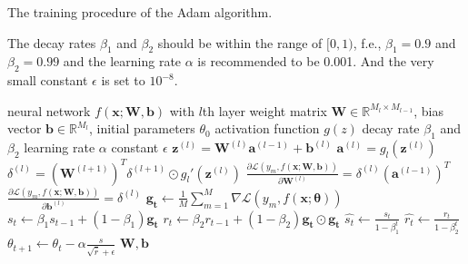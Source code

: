 \documentclass[
	parskip, 			   %
	twoside, 			   %
	DIV=14, 			   %
	BCOR=15.0mm, 		   %
	headsepline, 		   %
	open=right, 		   %
	captions=tableheading, %
	bibliography=totoc,    %
	numbers=noenddot       %
]{scrreprt}
\begin{document}
\clearpage
\begin{algorithm}[h!]
\caption{The training procedure of the Adam algorithm.}
The decay rates $\beta_1$ and $\beta_2$ should be within the range of $[0,1)$, f.e., $\beta_1=0.9$ and $\beta_2=0.99$ and the learning rate $\alpha$ is recommended to be 0.001. And the very small constant $\epsilon$ is set to $10^{-8}$.
\label{alg:Adam_alg}
    \begin{algorithmic}[1]
    \Require neural network $f(\mathbf{x};\mathbf{W},\mathbf{b})$ with $l$th layer
    \Require weight matrix $\mathbf{W} \in \mathbb{R}^{M_{l} \times M_{l-1}}$, bias vector $\mathbf{b} \in \mathbb{R}^{M_{l}}$, initial parameters $\theta_{0}$
    \Require activation function $g(z)$
    \Require decay rate $\beta_1$ and $\beta_2$
    \Require learning rate $\alpha$
    \Require constant $\epsilon$
     
            \State $\mathbf{z}^{(l)} = \mathbf{W}^{(l)} \mathbf{a}^{(l-1)} + \mathbf{b}^{(l)}$ 
            \State $\mathbf{a}^{(l)} = g_{l}(\mathbf{z}^{(l)})$ 
            \State {}
            \State $\delta^{(l)} = (\mathbf{W}^{(l+1)})^T \delta^{(l+1)} \odot g_{l}'(\mathbf{z}^{(l)})$ 
            \State {}
            \State $\frac{\partial \mathcal{L}\left( y_m,f(\mathbf{x};\mathbf{\mathbf{W},\mathbf{b}}) \right)}{\partial \mathbf{W}^{(l)}} = \delta^{(l)} (\mathbf{a}^{(l-1)})^T$ 
            \State $\frac{\partial \mathcal{L}\left( y_m,f(\mathbf{x};\mathbf{\mathbf{W},\mathbf{b}}) \right)}{\partial \mathbf{b}^{(l)}} = \delta^{(l)}$ 
            \State {}
        \EndFor
    \EndFor
    \State $\mathbf{g_t} \gets \frac{1}{M} \sum\nolimits_{m=1}^M \nabla \mathcal{L}\left( y_{m},f(\mathbf{x};\mathbf{\theta}) \right)$ 
    \State $s_t \gets \beta_1 s_{t-1} + (1-\beta_1) \mathbf{g_t}$ 
    \State $r_t \gets \beta_2 r_{t-1} + (1-\beta_2) \mathbf{g_t} \odot \mathbf{g_t}$ 
    \State {}
    \State $\hat{s_t} \gets \frac{s_t}{1-\beta_1^t}$ 
    \State $\hat{r_t} \gets \frac{r_t}{1-\beta_2^t}$ 
    \State {}
    \State $\theta_{t+1} \gets \theta_{t} - \alpha \frac{\hat{s}}{\sqrt{\hat{r}} + \epsilon}$ 
    \State {}
    \State \Return $\mathbf{W}, \mathbf{b}$ 
    \end{algorithmic}
\end{algorithm}
\end{document}
